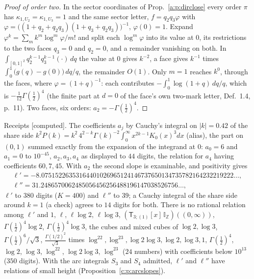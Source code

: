 \documentclass[11pt]{article}
\newcommand{\sT}{\mathsf T}
\newcommand{\IZ}{\mathbb I_{\mathbb Z}}
\newcommand{\Tx}[3]{(\sT_{#1;(1)}[x]\,#2)((#3,\infty))}
\theoremstyle{plain}
\theoremstyle{definition}
\theoremstyle{remark}
\newcommand{\computed}{\textup{[computed]}}
\begin{document}
\begin{proof}[Proof of order two]
In the sector coordinates of Prop.~\ref{a:p:dirclose} every order $\pi$ has $\kappa_{1,U_2}=\kappa_{1,U_3}=1$ and the same sector letter, $f=q_2q_3\varphi$ with $\varphi=\big((1+q_2+q_2q_3)(1+q_3+q_2q_3)\big)^{-1}$, $\varphi(0)=1$. Expand $\varphi^k=\sum_mk^m\log^m\varphi/m!$ and split each $\log^m\varphi$ into its value at $0$, its restrictions to the two faces $q_3=0$ and $q_2=0$, and a remainder vanishing on both. In $\int_{[0,1]^2}q_2^{k-1}q_3^{k-1}(\cdot)\,dq$ the value at $0$ gives $k^{-2}$, a face gives $k^{-1}$ times $\int_0^1\big(g(q)-g(0)\big)\,dq/q$, the remainder $O(1)$. Only $m=1$ reaches $k^0$, through the faces, where $\varphi=(1+q)^{-1}$: each contributes $-\int_0^1\log(1+q)\,dq/q$, which is $-\frac1{12}\Gamma(\frac12)^4$ (the finite part at $d=0$ of the face's own two-mark letter, Def.~1.4, p.~11). Two faces, six orders: $a_2=-\Gamma(\frac12)^4$.
\end{proof}

\noindent Receipts \computed. The coefficients $a_j$ by Cauchy's integral on $|k|=0.42$ of the share side $k^2P(k)=k^2\,4^{2-k}\Gamma(k)^{-2}\int_0^\infty x^{2k-1}K_0(x)^3dx$ (alias), the part on $(0,1)$ summed exactly from the expansion of the integrand at $0$: $a_0=6$ and $a_1=0$ to $10^{-45}$, $a_2,a_3,a_4$ as displayed to $44$ digits, the relation for $a_4$ having coefficients $60,7,45$. With $a_2$ the second slope is examinable, and positivity gives
\begin{gather*}
\ell'=-8.07515226353164401026965124146737650134735782164232219222\ldots,\\
\ell''=31.2486570062485056456256488196147038526756\ldots,
\end{gather*}
$\ell'$ to $380$ digits ($K=400$) and $\ell''$ to $39$; a Cauchy integral of the share side around $k=1$ (a check) agrees to $14$ digits for both. There is no rational relation among $\ell'$ and $1$, $\ell$, $\ell\log2$, $\ell\log3$, $\Tx3{\IZ}0$, $\Gamma(\frac12)^4\log2$, $\Gamma(\frac12)^4\log3$, the cubes and mixed cubes of $\log2,\log3$, $\Gamma(\frac12)^6/\sqrt3$, $\frac{\Gamma(1/2)^2}{\sqrt3}$ times $\log^22,\log^23,\log2\log3,\log2,\log3,1$, $\Gamma(\frac12)^4$, $\log2$, $\log3$, $\log^22$, $\log2\log3$, $\log^23$ ($24$ numbers) with coefficients below $10^{13}$ ($350$ digits). With the arc integrals $S_3$ and $S_4$ admitted, $\ell'$ and $\ell''$ have relations of small height (Proposition~\ref{c:p:arcslopes}).
\end{document}
